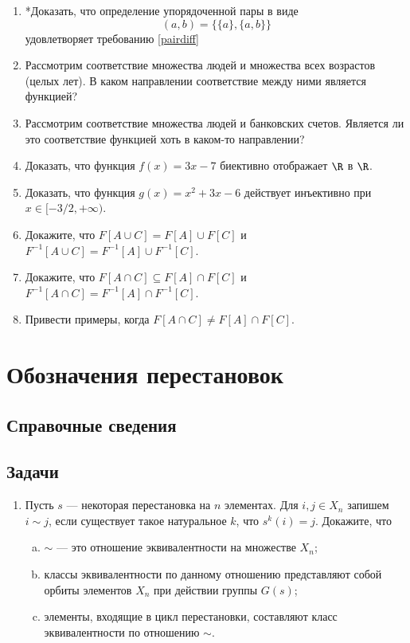\begin{enumerate}
\item *Доказать, что определение упорядоченной пары в виде
$$
(a,b) = \{\{a\},\{a,b\}\}
$$
удовлетворяет требованию \eqref{pairdiff}
\item Рассмотрим соответствие множества людей и множества всех возрастов (целых лет). В каком направлении соответствие между ними является функцией?
\item Рассмотрим соответствие множества людей и банковских счетов. Является ли это соответствие функцией хоть в каком-то направлении?
\item Доказать, что функция $f(x)=3x-7$ биективно отображает $\R$ в $\R$.
\item Доказать, что функция $g(x)=x^2+3x-6$ действует инъективно при $x\in[-3/2,+\infty)$.
\item Докажите, что $F[A\cup C]=F[A]\cup F[C]$ и $F^{-1}[A\cup C]=F^{-1}[A]\cup F^{-1}[C]$.
\item Докажите, что $F[A\cap C]\subseteq F[A]\cap F[C]$ и $F^{-1}[A\cap C]=F^{-1}[A]\cap F^{-1}[C]$.
\item Привести примеры, когда $F[A\cap C]\ne F[A]\cap F[C]$.
\end{enumerate}



\section{Обозначения перестановок}

\subsection*{Справочные сведения}

\subsection*{Задачи}

\begin{enumerate}
\item Пусть $s$ --- некоторая перестановка на $n$ элементах. Для $i,j\in X_n$ запишем $i\sim j$, если существует такое натуральное $k$, что $s^k(i)=j$. Докажите, что
\begin{enumerate}[a)]
\item $\sim$ --- это отношение эквивалентности на множестве $X_n$;
\item классы эквивалентности по данному отношению представляют собой орбиты элементов $X_n$ при действии группы $G(s)$;
\item элементы, входящие в цикл перестановки, составляют класс эквивалентности по отношению $\sim$.
\end{enumerate}
\end{enumerate}



